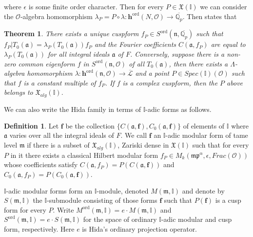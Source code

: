 \documentclass[reqno,10pt]{amsart}
\newcommand{\qp}{\mathbb{Q}_{p}}
\newcommand{\h}{\mathbf{h}}
\newcommand{\I}{\mathbb{I}}
\newcommand{\f}{\mathbf{f}}
\newcommand{\ma}{\mathfrak{a}}
\newcommand{\p}{\mathfrak{p}}
\newcommand{\n}{\mathfrak{n}}
\theoremstyle{plain}
\newtheorem{thm}{Theorem}[section]
\theoremstyle{definition}
\newtheorem{defn}{Definition}
\begin{document}
where $\epsilon$ is some finite order character. Then for every $P \in \mathfrak{X}(\I)$ we can consider the $\mathcal{O}$-algebra homomorphism $\lambda_P = P \circ \lambda : \h^{\mathrm{ord}}(N,\mathcal{O}) \rightarrow \overline{\qp}$. Then \cite[Theorem 5.6]{Hida1} states that
\begin{thm}
    There exists a unique cuspform $f_P \in S^{\mathrm{ord}}(\n,\overline{\qp})$ such that $f_P|T_0(\mathfrak{a}) = \lambda_P(T_0(\mathfrak{a}))f_P$ and the Fourier coefficients $C(\mathfrak{a},f_P)$ are equal to $\lambda_P(T_0(\mathfrak{a}))$ for all integral ideals $\mathfrak{a}$ of $F$. Conversely, suppose there is a non-zero common eigenform $f$ in $S^{\mathrm{ord}}(\n,\mathcal{O})$ of all $T_0(\mathfrak{a})$, then there exists a $\Lambda$-algebra homomorphism $\lambda : \h^{\mathrm{ord}}(\n,\mathcal{O}) \rightarrow \overline{\mathcal{L}}$ and a point $P \in Spec(\I)(\mathcal{O})$ such that $f$ is a constant multiple of $f_P$. If $f$ is a complex cuspform, then the $P$ above belongs to $\mathfrak{X}_{alg}(\I)$.
\end{thm} 
We can also write the Hida family in terms of $\I$-adic forms as follows.
\begin{defn}
    Let $\f$ be the collection $\{C(\ma,\f), C_0(\ma,\f)\}$ of elements of $\I$ where $\ma$ varies over all the integral ideals of $F$. We call $\f$ an $\I$-adic modular form of tame level $\mathfrak{m}$ if there is a subset of $\mathfrak{X}_{alg}(\I)$, Zariski dense in $\mathfrak{X}(\I)$ such that for every $P$ in it there exists a classical Hilbert modular form $f_P \in M_k(\mathfrak{m}\p^\alpha,\epsilon,Frac(\mathcal{O}))$ whose coefficients satisfy $C(\mathfrak{a},f_P) = P(C(\mathfrak{a},\f))$ and $C_0(\mathfrak{a},f_P) = P(C_0(\mathfrak{a},\f))$. 
\end{defn}
$\I$-adic modular forms form an $\I$-module, denoted $M(\mathfrak{m},\I)$ and denote by $S(\mathfrak{m},\I)$ the $\I$-submodule consisting of those forms $\f$ such that $P(\f)$ is a cusp form for every $P$. Write $M^{\mathrm{ord}}(\mathfrak{m},\I) = e \cdot M(\mathfrak{m},\I)$ and $S^{\mathrm{ord}}(\mathfrak{m},\I) = e \cdot S(\mathfrak{m},\I)$ for the space of ordinary $\I$-adic modular and cusp form, respectively. Here $e$ is Hida's ordinary projection operator. 
\end{document}

